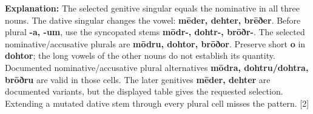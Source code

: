 \textbf{Explanation:} The selected genitive singular equals the nominative in all three nouns. The dative singular changes the vowel: \textbf{mēder, dehter, brēðer}. Before plural \textbf{-a, -um}, use the syncopated stems \textbf{mōdr-, dohtr-, brōðr-}. The selected nominative/\allowbreak{}accusative plurals are \textbf{mōdru, dohtor, brōðor}. Preserve short \textbf{o} in \textbf{dohtor}; the long vowels of the other nouns do not establish its quantity. Documented nominative/\allowbreak{}accusative plural alternatives \textbf{mōdra, dohtru/\allowbreak{}dohtra, brōðru} are valid in those cells. The later genitives \textbf{mēder, dehter} are documented variants, but the displayed table gives the requested selection. Extending a mutated dative stem through every plural cell misses the pattern. [2]

